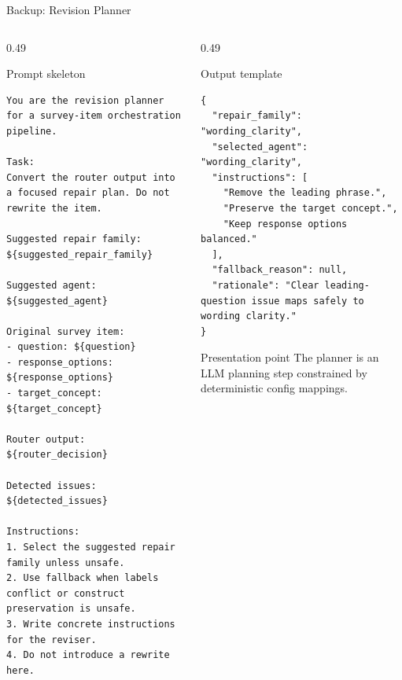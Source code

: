 \documentclass[aspectratio=169]{beamer}
\begin{document}
\begin{frame}[fragile]{Backup: Revision Planner}
  \begin{columns}[T]
    \begin{column}{0.49\textwidth}
      \begin{block}{Prompt skeleton}
\begin{lstlisting}
You are the revision planner for a survey-item orchestration pipeline.

Task:
Convert the router output into a focused repair plan. Do not rewrite the item.

Suggested repair family:
${suggested_repair_family}

Suggested agent:
${suggested_agent}

Original survey item:
- question: ${question}
- response_options: ${response_options}
- target_concept: ${target_concept}

Router output:
${router_decision}

Detected issues:
${detected_issues}

Instructions:
1. Select the suggested repair family unless unsafe.
2. Use fallback when labels conflict or construct preservation is unsafe.
3. Write concrete instructions for the reviser.
4. Do not introduce a rewrite here.
\end{lstlisting}
      \end{block}
    \end{column}
    \begin{column}{0.49\textwidth}
      \begin{block}{Output template}
\begin{lstlisting}
{
  "repair_family": "wording_clarity",
  "selected_agent": "wording_clarity",
  "instructions": [
    "Remove the leading phrase.",
    "Preserve the target concept.",
    "Keep response options balanced."
  ],
  "fallback_reason": null,
  "rationale": "Clear leading-question issue maps safely to wording clarity."
}
\end{lstlisting}
      \end{block}

      \begin{alertblock}{Presentation point}
        The planner is an LLM planning step constrained by deterministic config mappings.
      \end{alertblock}
    \end{column}
  \end{columns}
\end{frame}
\end{document}
